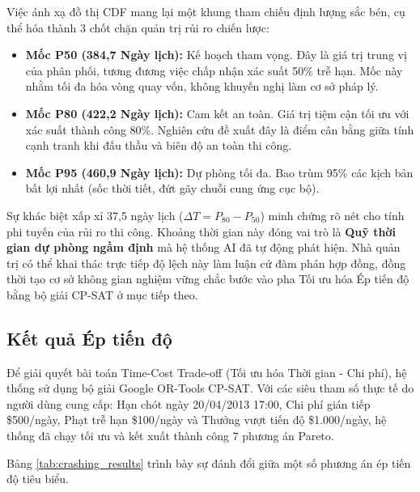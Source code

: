 Việc ánh xạ đồ thị CDF mang lại một khung tham chiếu định lượng sắc bén, cụ thể hóa thành 3 chốt chặn quản trị rủi ro chiến lược:
\begin{itemize}
    \item \textbf{Mốc P50 (384,7 Ngày lịch):} Kế hoạch tham vọng. Đây là giá trị trung vị của phân phối, tương đương việc chấp nhận xác suất 50\% trễ hạn. Mốc này nhằm tối đa hóa vòng quay vốn, không khuyến nghị làm cơ sở pháp lý.
    \item \textbf{Mốc P80 (422,2 Ngày lịch):} Cam kết an toàn. Giá trị tiệm cận tối ưu với xác suất thành công 80\%. Nghiên cứu đề xuất đây là điểm cân bằng giữa tính cạnh tranh khi đấu thầu và biên độ an toàn thi công.
    \item \textbf{Mốc P95 (460,9 Ngày lịch):} Dự phòng tối đa. Bao trùm 95\% các kịch bản bất lợi nhất (sốc thời tiết, đứt gãy chuỗi cung ứng cục bộ).
\end{itemize}

Sự khác biệt xấp xỉ 37,5 ngày lịch ($\Delta T = P_{80} - P_{50}$) minh chứng rõ nét cho tính phi tuyến của rủi ro thi công. Khoảng thời gian này đóng vai trò là \textbf{Quỹ thời gian dự phòng ngầm định} mà hệ thống AI đã tự động phát hiện. Nhà quản trị có thể khai thác trực tiếp độ lệch này làm luận cứ đàm phán hợp đồng, đồng thời tạo cơ sở không gian nghiệm vững chắc bước vào pha Tối ưu hóa Ép tiến độ bằng bộ giải CP-SAT ở mục tiếp theo.

\subsection{Kết quả Ép tiến độ}
\label{sec:3.4.2_crashing}

Để giải quyết bài toán Time-Cost Trade-off (Tối ưu hóa Thời gian - Chi phí), hệ thống sử dụng bộ giải Google OR-Tools CP-SAT. Với các siêu tham số thực tế do người dùng cung cấp: Hạn chót ngày 20/04/2013 17:00, Chi phí gián tiếp \$500/ngày, Phạt trễ hạn \$100/ngày và Thưởng vượt tiến độ \$1.000/ngày, hệ thống đã chạy tối ưu và kết xuất thành công 7 phương án Pareto.

Bảng \ref{tab:crashing_results} trình bày sự đánh đổi giữa một số phương án ép tiến độ tiêu biểu.

